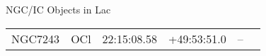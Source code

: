 \begin{block}{NGC/IC Objects in Lac}
  \centering
  \begin{tabularx}{\textwidth}{llrrll} \toprule 
    NGC7243 & OCl & 22:15:08.58 & +49:53:51.0  & -- \\ 
  \end{tabularx}
\end{block}